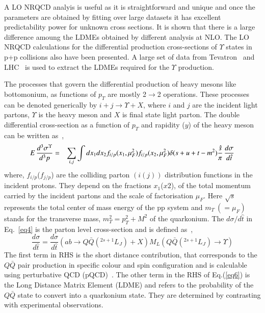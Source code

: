 A LO NRQCD analyis is useful as it is straightforward and unique and once the parameters are
obtained by fitting over large datasets it has excellent predictability power for unknown cross
sections.
 It is shown that there is a large difference amoung the LDMEs obtained by different
analysis at NLO.
The LO NRQCD calculations for the differential production
cross-sections of $\Upsilon$ states in p+p collisions also have been presented.
A large set of data from Tevatron~\cite{Acosta:2001gv} and
LHC~\cite{LHCb:2012aa,Khachatryan:2015qpa,Aad:2012dlq,Chatrchyan:2013yna,Sirunyan:2017qdw} 
is used to extract the LDMEs required for the $\Upsilon$ production.

The processes that govern the differential
production of heavy mesons like bottomonium, as functions of $p_T$ are mostly
2$\rightarrow$2 operations. These processes can be denoted generically by 
$i+j\rightarrow \Upsilon +X$, where $i$ and $j$ are the incident light partons,
$\Upsilon$ is the heavy meson and $X$ is final state light parton.
The double differential cross-section as a function of $p_T$ and rapidity ($y$) of 
the heavy meson can be written as~\cite{Kumar:2016ojy},
\begin{eqnarray}
  \nonumber
  E\,\frac{d^3\sigma^{\Upsilon} }{d^3p} &=& \sum_{i,j} \int dx_1 dx_2 f_{i/p}(x_1,\mu_F^2)
  f_{i/p}(x_2,\mu_F^2) \delta(s+u+t-m^2) {\hat{s} \over \pi} \, \frac{d\sigma}{d\hat{t}}
  \label{eq4}
\end{eqnarray}
where, $f_{i/p}$($f_{j/p}$) are the colliding parton $(i(j))$ distribution functions in
the incident protons. They depend on the fractions $x_1$($x2$), of the total momentum
carried by the incident partons and the scale of factorisation $\mu_F$.
Here $\sqrt{s}$ represents the total center of mass energy of the pp system and $m_T~(=\mu_F)$ stands for
the transverse mass, $m_T^2=p_T^2 + M^2$ of the quarkonium.
The ${d\sigma}/{d\hat{t}}$ in Eq.~\ref{eq4} is the parton level cross-section and is
defined as~\cite{Bodwin:1994jh},
\begin{equation}
  \frac{d\sigma}{d\hat{t}} = \frac{d\sigma}{d\hat{t}}(ab\rightarrow Q\bar{Q}(^{2s+1}L_J)+X)
  M_L(Q\bar{Q}(^{2s+1}L_J)\rightarrow \Upsilon)
  \label{eq6}
\end{equation}
The first term in RHS is the short distance contribution, that corresponds to the $Q\bar{Q}$
pair production in specific colour and spin configuration and is calculable using 
perturbative QCD (pQCD)~\cite{Braaten:2000cm,Baier:1983va,Humpert:1986cy,Gastmans:1987be,Cho:1995vh,Cho:1995ce}.
The other term in the RHS of Eq.(\ref{eq6}) is the Long Distance Matrix Element (LDME)
and refers to the probability of the $Q\bar{Q}$ state to convert into a quarkonium state.
They are determined by contrasting with experimental observations. 




